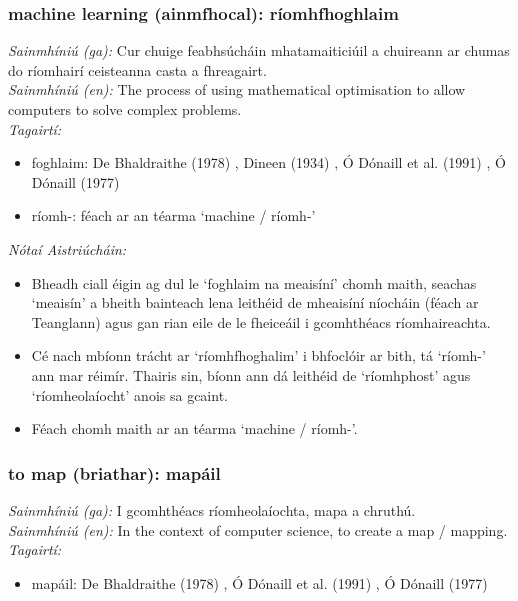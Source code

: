 \subsubsection*{machine learning (ainmfhocal): ríomhfhoghlaim}
 \noindent \textit{Sainmhíniú (ga):} Cur chuige feabhsúcháin mhatamaiticiúil a chuireann ar chumas do ríomhairí ceisteanna casta a fhreagairt.
\\
 \noindent \textit{Sainmhíniú (en):} The process of using mathematical optimisation to allow computers to solve complex problems.
\\
 \noindent \textit{Tagairtí:}
\begin{itemize}
	\item foghlaim: De Bhaldraithe (1978) \cite{de-bhaldraithe}, Dineen (1934) \cite{dineen}, Ó Dónaill et al. (1991) \cite{focloir-beag}, Ó Dónaill (1977) \cite{odonaill}
	\item ríomh-: féach ar an téarma `machine / ríomh-'
\end{itemize}

 \noindent \textit{Nótaí Aistriúcháin:}
\begin{itemize}
	\item Bheadh ciall éigin ag dul le `foghlaim na meaisíní' chomh maith, seachas `meaisín' a bheith bainteach lena leithéid de mheaisíní níocháin (féach ar Teanglann) agus gan rian eile de le fheiceáil i gcomhthéacs ríomhaireachta.
	\item Cé nach mbíonn trácht ar `ríomhfhoghalim' i bhfoclóir ar bith, tá `ríomh-' ann mar réimír. Thairis sin, bíonn ann dá leithéid de `ríomhphost' agus `ríomheolaíocht' anois sa gcaint.
	\item Féach chomh maith ar an téarma `machine / ríomh-'.
\end{itemize}


\subsubsection*{to map (briathar): mapáil}
 \noindent \textit{Sainmhíniú (ga):} I gcomhthéacs ríomheolaíochta, mapa a chruthú.
\\
 \noindent \textit{Sainmhíniú (en):} In the context of computer science, to create a map / mapping.
\\
 \noindent \textit{Tagairtí:}
\begin{itemize}
	\item mapáil: De Bhaldraithe (1978) \cite{de-bhaldraithe}, Ó Dónaill et al. (1991) \cite{focloir-beag}, Ó Dónaill (1977) \cite{odonaill}
\end{itemize}

